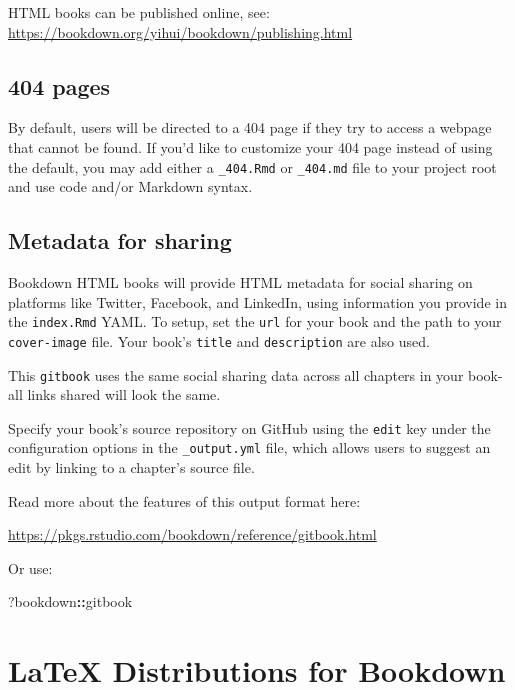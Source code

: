 \documentclass[
]{book}
\newenvironment{Shaded}{\begin{snugshade}}{\end{snugshade}}
\newcommand{\NormalTok}[1]{#1}
\newcommand{\SpecialCharTok}[1]{\textcolor[rgb]{0.81,0.36,0.00}{\textbf{#1}}}
\theoremstyle{definition}
\theoremstyle{definition}
\theoremstyle{definition}
\theoremstyle{definition}
\theoremstyle{remark}
\begin{document}
HTML books can be published online, see: \url{https://bookdown.org/yihui/bookdown/publishing.html}

\section{404 pages}\label{pages}

By default, users will be directed to a 404 page if they try to access a webpage that cannot be found. If you'd like to customize your 404 page instead of using the default, you may add either a \texttt{\_404.Rmd} or \texttt{\_404.md} file to your project root and use code and/or Markdown syntax.

\section{Metadata for sharing}\label{metadata-for-sharing}

Bookdown HTML books will provide HTML metadata for social sharing on platforms like Twitter, Facebook, and LinkedIn, using information you provide in the \texttt{index.Rmd} YAML. To setup, set the \texttt{url} for your book and the path to your \texttt{cover-image} file. Your book's \texttt{title} and \texttt{description} are also used.

This \texttt{gitbook} uses the same social sharing data across all chapters in your book- all links shared will look the same.

Specify your book's source repository on GitHub using the \texttt{edit} key under the configuration options in the \texttt{\_output.yml} file, which allows users to suggest an edit by linking to a chapter's source file.

Read more about the features of this output format here:

\url{https://pkgs.rstudio.com/bookdown/reference/gitbook.html}

Or use:

\begin{Shaded}
\begin{Highlighting}[]
\NormalTok{?bookdown}\SpecialCharTok{::}\NormalTok{gitbook}
\end{Highlighting}
\end{Shaded}

\chapter{LaTeX Distributions for Bookdown}\label{latex-distributions-for-bookdown}
\end{document}
